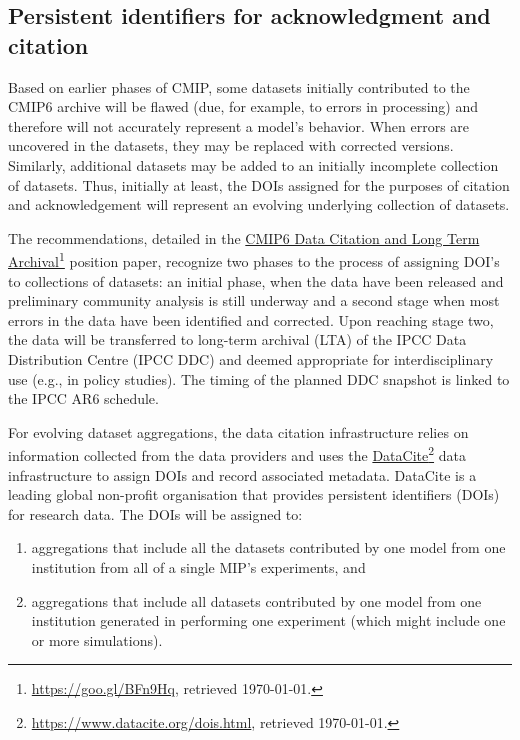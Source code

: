 \documentclass[gmd,manuscript]{copernicus}
\newcommand{\urlref}[2] {\href{#1}{#2}\footnote{\url{#1}, retrieved \today.}}
\begin{document}
\subsection{Persistent identifiers for acknowledgment and citation}
\label{sec:doi}


Based on earlier phases of CMIP, some datasets initially contributed
to the CMIP6 archive will be flawed (due, for example, to errors in
processing) and therefore will not accurately represent a model's
behavior. When errors are uncovered in the datasets, they may be
replaced with corrected versions. Similarly, additional datasets may
be added to an initially incomplete collection of datasets. Thus,
initially at least, the DOIs assigned for the purposes of citation and
acknowledgement will represent an evolving underlying collection of
datasets.

The recommendations, detailed in the
\urlref{https://goo.gl/BFn9Hq}{CMIP6 Data Citation and Long Term
  Archival} position paper, recognize two phases to the process of
assigning DOI's to collections of datasets: an initial phase, when the
data have been released and preliminary community analysis is still
underway and a second stage when most errors in the data have been
identified and corrected. Upon reaching stage two, the data will be
transferred to long-term archival (LTA) of the IPCC Data Distribution
Centre (IPCC DDC) and deemed appropriate for interdisciplinary use
(e.g., in policy studies). The timing of the planned DDC snapshot is
linked to the IPCC AR6 schedule.

For evolving dataset aggregations, the data citation infrastructure
relies on information collected from the data providers and uses the
\urlref{https://www.datacite.org/dois.html}{DataCite} data
infrastructure to assign DOIs and record associated metadata.
DataCite is a leading global non-profit organisation that provides
persistent identifiers (DOIs) for research data. The DOIs will be
assigned to:

\begin{enumerate}
\item aggregations that include all the datasets contributed by one
  model from one institution from all of a single MIP's experiments,
  and
\item aggregations that include all datasets contributed by one model
  from one institution generated in performing one experiment (which
  might include one or more simulations).
\end{enumerate}
\end{document}
